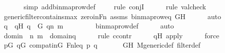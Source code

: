\begin{isabellebody}
\ \ \ \ \ \isamarkupfalse%
\ {\isacharparenleft}{\kern0pt}simp\ add{\isacharcolon}{\kern0pt}binmap{\isacharunderscore}{\kern0pt}row{\isacharunderscore}{\kern0pt}def{\isacharparenright}{\kern0pt}\isanewline
\ \ \ \ \isamarkupfalse%
{\isacharparenleft}{\kern0pt}rule\ conjI{\isacharparenright}{\kern0pt}\isanewline
\ \ \ \ \ \isamarkupfalse%
{\isacharparenleft}{\kern0pt}rule\ valcheck{\isacharparenright}{\kern0pt}\isanewline
\ \ \ \ \isamarkupfalse%
\ generic{\isacharunderscore}{\kern0pt}filter{\isacharunderscore}{\kern0pt}contains{\isacharunderscore}{\kern0pt}max\ zero{\isacharunderscore}{\kern0pt}in{\isacharunderscore}{\kern0pt}Fn\ assms\ binmap{\isacharunderscore}{\kern0pt}row{\isacharunderscore}{\kern0pt}eq\ GH\isanewline
\ \ \ \ \isamarkupfalse%
\ auto\isanewline
\ \ \isamarkupfalse%
\ \isamarkupfalse%
\ q\ \ qH{\isacharcolon}{\kern0pt}\ {\isachardoublequoteopen}q\ {\isasymin}\ G{\isachardoublequoteclose}\ {\isachardoublequoteopen}q{\isacharbackquote}{\kern0pt}{\isacharless}{\kern0pt}n{\isacharcomma}{\kern0pt}\ m{\isachargreater}{\kern0pt}\ {\isacharequal}{\kern0pt}\ {}{\isachardoublequoteclose}\ \isanewline
\ \ \ \ \isamarkupfalse%
\ binmap{\isacharunderscore}{\kern0pt}row{\isacharunderscore}{\kern0pt}def\isanewline
\ \ \ \ \isamarkupfalse%
\ auto\isanewline
\isanewline
\ \ \isamarkupfalse%
\ domin\ {\isacharcolon}{\kern0pt}\ {\isachardoublequoteopen}{\isacharless}{\kern0pt}n{\isacharcomma}{\kern0pt}\ m{\isachargreater}{\kern0pt}\ {\isasymin}\ domain{\isacharparenleft}{\kern0pt}q{\isacharparenright}{\kern0pt}{\isachardoublequoteclose}\ \isanewline
\ \ \ \ \isamarkupfalse%
{\isacharparenleft}{\kern0pt}rule\ ccontr{\isacharparenright}{\kern0pt}\isanewline
\ \ \ \ \isamarkupfalse%
\ qH\ apply{\isacharunderscore}{\kern0pt}{}\isanewline
\ \ \ \ \isamarkupfalse%
\ force\isanewline
\isanewline
\ \ \isamarkupfalse%
\ {\isachardoublequoteopen}{\isasymforall}p{\isasymin}G{\isachardot}{\kern0pt}\ {\isasymforall}q{\isasymin}G{\isachardot}{\kern0pt}\ compat{\isacharunderscore}{\kern0pt}in{\isacharparenleft}{\kern0pt}G{\isacharcomma}{\kern0pt}\ Fn{\isacharunderscore}{\kern0pt}leq{\isacharcomma}{\kern0pt}\ p{\isacharcomma}{\kern0pt}\ q{\isacharparenright}{\kern0pt}{\isachardoublequoteclose}\ \isanewline
\ \ \ \ \isamarkupfalse%
\ GH\ M{\isacharunderscore}{\kern0pt}generic{\isacharunderscore}{\kern0pt}def\ filter{\isacharunderscore}{\kern0pt}def\ \isamarkupfalse%

\end{isabellebody}

